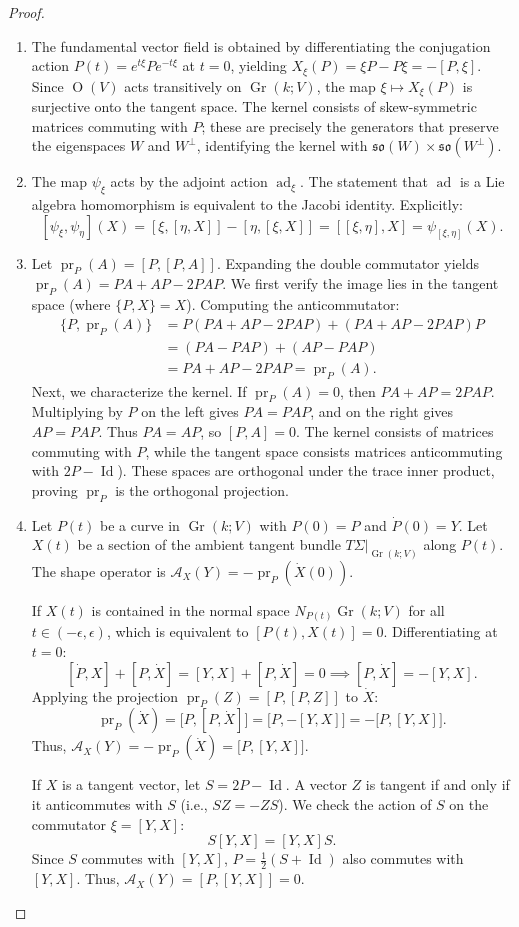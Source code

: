 \documentclass[12pt, final]{article}
\def\A{\mathcal{A}}
\def\pr{\operatorname{pr}}
\def\ad{\operatorname{ad}}
\def\O{\operatorname{O}}
\def\Gr{\operatorname{Gr}}
\def\Id{\operatorname{Id}}
\def\so{\mathfrak{so}}
\begin{document}
\begin{proof}\
    \begin{enumerate}
        \item
The fundamental vector field is obtained by differentiating the conjugation action $P(t) = e^{t\xi} P e^{-t\xi}$ at $t=0$, yielding $X_\xi(P) = \xi P - P \xi = -[P, \xi]$.
Since $\O(V)$ acts transitively on $\Gr(k; V)$, the map $\xi \mapsto X_\xi(P)$ is surjective onto the tangent space. The kernel consists of skew-symmetric matrices commuting with $P$; these are precisely the generators that preserve the eigenspaces $W$ and $W^\perp$, identifying the kernel with $\so(W) \times \so(W^\perp)$.

\item 
The map $\psi_\xi$ acts by the adjoint action $\ad_\xi$. The statement that $\ad$ is a Lie algebra homomorphism is equivalent to the Jacobi identity. Explicitly:
\[ [\psi_\xi, \psi_\eta](X) = [\xi, [\eta, X]] - [\eta, [\xi, X]] = [[\xi, \eta], X] = \psi_{[\xi, \eta]}(X). \]
\item Let $\pr_P(A) = [P, [P, A]]$. Expanding the double commutator yields $\pr_P(A) = PA + AP - 2PAP$.
We first verify the image lies in the tangent space (where $\{P, X\} = X$). Computing the anticommutator:
\begin{align*}
    \{P, \pr_P(A)\} &= P(PA + AP - 2PAP) + (PA + AP - 2PAP)P \\
    &= (PA - PAP) + (AP - PAP) \\
    &= PA + AP - 2PAP = \pr_P(A).
\end{align*}
Next, we characterize the kernel. If $\pr_P(A) = 0$, then $PA + AP = 2PAP$. Multiplying by $P$ on the left gives $PA = PAP$, and on the right gives $AP = PAP$. Thus $PA = AP$, so $[P, A] = 0$.
The kernel consists of matrices commuting with $P$, while the tangent space consists matrices anticommuting with $2P-\Id$). These spaces are orthogonal under the trace inner product, proving $\pr_P$ is the orthogonal projection.
\item 
Let $P(t)$ be a curve in $\Gr(k; V)$ with $P(0)=P$ and $\dot{P}(0)=Y$. Let $X(t)$ be a section of the ambient tangent bundle $T\Sigma|_{\Gr(k; V)}$ along $P(t)$. The shape operator is $\A_X(Y) = -\pr_P(\dot{X}(0))$.

If $X(t)$ is contained in the normal space $N_{P(t)}\Gr(k; V)$ for all $t \in (-\epsilon, \epsilon)$, which is equivalent to $[P(t), X(t)] = 0$. Differentiating at $t=0$:
\[ [\dot{P}, X] + [P, \dot{X}] = [Y, X] + [P, \dot{X}] = 0 \implies [P, \dot{X}] = -[Y, X]. \]
Applying the projection $\pr_P(Z) = [P, [P, Z]]$ to $\dot{X}$:
\[ \pr_P(\dot{X}) = \big[P, [P, \dot{X}]\big] = \big[P, -[Y, X]\big] = -\big[P, [Y, X]\big]. \]
Thus, $\A_X(Y) = -\pr_P(\dot{X}) = \big[P, [Y, X]\big]$.

If $X$ is a tangent vector, let $S = 2P - \Id$. A vector $Z$ is tangent if and only if it anticommutes with $S$ (i.e., $SZ = -ZS$).
We check the action of $S$ on the commutator $\xi = [Y, X]$:
\[ S[Y, X] = [Y, X]S. \]
Since $S$ commutes with $[Y, X]$, $P = \frac{1}{2}(S+\Id)$ also commutes with $[Y, X]$.
Thus, $\A_X(Y) = [P, [Y, X]] = 0$.
    \end{enumerate}
\end{proof}
\end{document}
